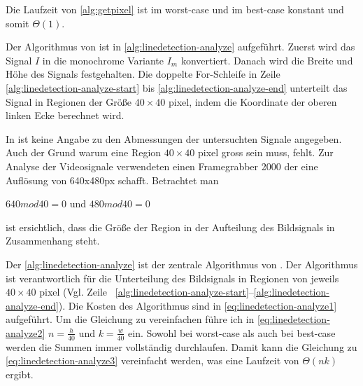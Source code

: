 

Die Laufzeit von \autoref{alg:getpixel} ist im worst-case und im best-case konstant und somit $\Theta(1)$.

Der Algorithmus von \citeauthor{clarke96} ist in \autoref{alg:linedetection-analyze} aufgeführt. Zuerst wird das
 Signal $I$ in die monochrome Variante $I_m$ konvertiert. Danach wird die Breite und Höhe des Signals festgehalten. Die
 doppelte For-Schleife in Zeile \ref{alg:linedetection-analyze-start} bis \ref{alg:linedetection-analyze-end} unterteilt
 das Signal in Regionen der Größe $40 \times 40$ \gls{pixel}, indem die Koordinate der oberen linken Ecke berechnet
 wird.



In \citeauthor{clarke96} ist keine Angabe zu den Abmessungen der untersuchten Signale angegeben. Auch der Grund warum
 eine Region $40 \times 40$ \gls{pixel} gross sein muss, fehlt. Zur Analyse der Videosignale verwendeten
 \citeauthor{clarke96} einen Framegrabber 2000 der eine Auflösung von 640x480px schafft. Betrachtet man

$640 mod 40 = 0$ und $480 mod 40 = 0$

ist ersichtlich, dass die Größe der Region in der Aufteilung des Bildsignals in Zusammenhang steht.

Der \autoref{alg:linedetection-analyze} ist der zentrale Algorithmus von \citeauthor{clarke96}. Der Algorithmus
 ist verantwortlich für die Unterteilung des Bildsignals in Regionen von jeweils $40 \times 40$ \gls{pixel} (Vgl. Zeile
~\ref{alg:linedetection-analyze-start}--\ref{alg:linedetection-analyze-end}). Die Kosten des Algorithmus sind in \autoref{eq:linedetection-analyze1} aufgeführt. Um die Gleichung zu vereinfachen führe ich in \autoref{eq:linedetection-analyze2} $n = \tfrac{h}{40}$ und $k = \tfrac{w}{40}$ ein. Sowohl bei worst-case als auch bei best-case werden die Summen immer vollständig durchlaufen. Damit kann die Gleichung zu \autoref{eq:linedetection-analyze3} vereinfacht werden, was eine Laufzeit von $\Theta(nk)$ ergibt.

